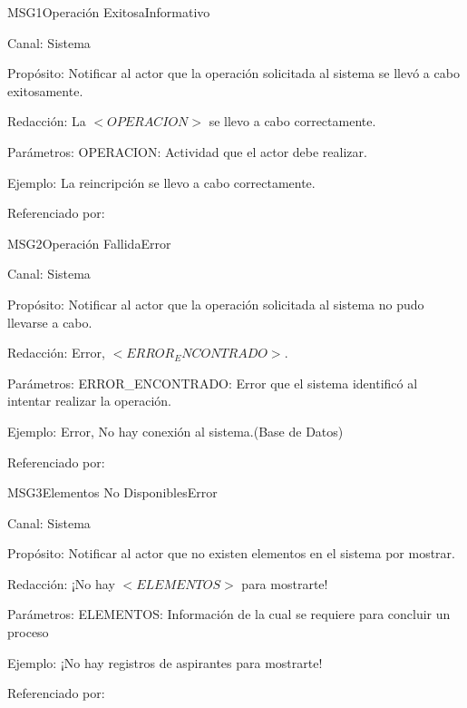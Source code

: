 \begin{mensaje}{MSG1}{Operación Exitosa}{Informativo }
	\item[Canal:] Sistema
	\item[Propósito:] Notificar al actor que la operación solicitada al sistema se llevó a cabo exitosamente.
	\item[Redacción:] La $<OPERACION>$ se llevo a cabo correctamente.
	\item[Parámetros:] OPERACION: Actividad que el actor debe realizar.
	\item[Ejemplo:] La reincripción se llevo a cabo correctamente.
	\item[Referenciado por:] 
\end{mensaje}

\begin{mensaje}{MSG2}{Operación Fallida}{Error}
	\item[Canal:] Sistema
	\item[Propósito:] Notificar al actor que la operación solicitada al sistema no pudo llevarse a cabo.
	\item[Redacción:] Error, $<ERROR_ENCONTRADO>$.
	\item[Parámetros:] ERROR\_ENCONTRADO: Error que el sistema identificó al intentar realizar la operación.
	\item[Ejemplo:] Error, No hay conexión al sistema.(Base de Datos)
	\item[Referenciado por: ] 
\end{mensaje}


\begin{mensaje}{MSG3}{Elementos No Disponibles}{Error}
	\item[Canal:] Sistema
	\item[Propósito:] Notificar al actor que no existen elementos en el sistema por mostrar.
	\item[Redacción:] ¡No hay $<ELEMENTOS>$ para mostrarte!
	\item[Parámetros:] ELEMENTOS: Información de la cual se requiere para concluir un proceso
	\item[Ejemplo:] ¡No hay registros de aspirantes para mostrarte!
	\item[Referenciado por: ] 
	
\end{mensaje}

